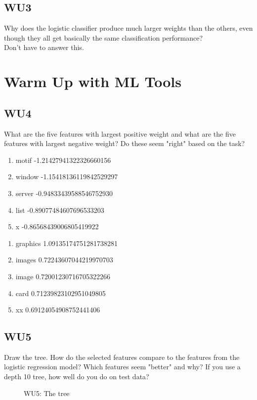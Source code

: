 \documentclass[a4paper,11pt]{article}
\begin{document}
\subsection{WU3}
\textsf{Why does the logistic classifier produce much larger weights
  than the others, even though they all get basically the same
  classification performance?}\\ Don't have to answer this.

\section{Warm Up with ML Tools}
\label{sec:warmup}
\subsection{WU4}
\textsf{What are the five features with largest positive weight and what
are the five features with largest negative weight? Do these seem "right"
based on the task?}\\

\begin{enumerate}
 \item motif -1.21427941322326660156
 \item window -1.15418136119842529297
 \item server -0.94833439588546752930
 \item list -0.89077484607696533203
 \item x -0.86568439006805419922
\end{enumerate}

\begin{enumerate}
 \item graphics 1.09135174751281738281
 \item images 0.72243607044219970703
 \item image 0.72001230716705322266
 \item card 0.71239823102951049805
 \item xx 0.69124054908752441406
\end{enumerate}

\subsection{WU5}
\textsf{ Draw the tree. How do the selected features compare to the
  features from the logistic regression model? Which features seem
  "better" and why? If you use a depth 10 tree, how well do you do on
  test data?}\\
\begin{figure}[h!]
  \caption{WU5: The tree}
  \centering
\end{figure}
\end{document}
